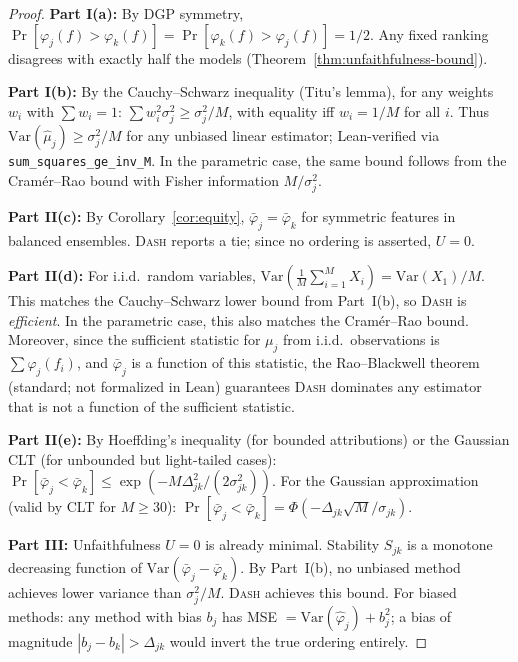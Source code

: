 \documentclass{article}
\newcommand{\Var}{\mathrm{Var}}
\newcommand{\DASH}{\textsc{Dash}}
\begin{document}
\begin{proof}
\textbf{Part I(a):} By DGP symmetry, $\Pr[\varphi_j(f) > \varphi_k(f)] = \Pr[\varphi_k(f) > \varphi_j(f)] = 1/2$. Any fixed ranking disagrees with exactly half the models (Theorem~\ref{thm:unfaithfulness-bound}).\label{thm:no-method-beats-half}

\textbf{Part I(b):} By the Cauchy--Schwarz inequality (Titu's lemma), for any weights $w_i$ with $\sum w_i = 1$: $\sum w_i^2 \sigma_j^2 \geq \sigma_j^2/M$, with equality iff $w_i = 1/M$ for all $i$. Thus $\Var(\hat\mu_j) \geq \sigma_j^2/M$ for any unbiased linear estimator; Lean-verified via \texttt{sum\_squares\_ge\_inv\_M}. In the parametric case, the same bound follows from the Cram\'er--Rao bound with Fisher information $M/\sigma_j^2$.

\textbf{Part II(c):} By Corollary~\ref{cor:equity}, $\bar\varphi_j = \bar\varphi_k$ for symmetric features in balanced ensembles. \DASH{} reports a tie; since no ordering is asserted, $U = 0$.

\textbf{Part II(d):} For i.i.d.\ random variables, $\Var(\frac{1}{M}\sum_{i=1}^M X_i) = \Var(X_1)/M$. This matches the Cauchy--Schwarz lower bound from Part~I(b), so \DASH{} is \emph{efficient}. In the parametric case, this also matches the Cram\'er--Rao bound. Moreover, since the sufficient statistic for $\mu_j$ from i.i.d.\ observations is $\sum \varphi_j(f_i)$, and $\bar\varphi_j$ is a function of this statistic, the Rao--Blackwell theorem (standard; not formalized in Lean) guarantees \DASH{} dominates any estimator that is not a function of the sufficient statistic.

\textbf{Part II(e):} By Hoeffding's inequality (for bounded attributions) or the Gaussian CLT (for unbounded but light-tailed cases): $\Pr[\bar\varphi_j < \bar\varphi_k] \leq \exp(-M\Delta_{jk}^2/(2\sigma_{jk}^2))$. For the Gaussian approximation (valid by CLT for $M \geq 30$): $\Pr[\bar\varphi_j < \bar\varphi_k] = \Phi(-\Delta_{jk}\sqrt{M}/\sigma_{jk})$.

\textbf{Part III:} Unfaithfulness $U = 0$ is already minimal. Stability $S_{jk}$ is a monotone decreasing function of $\Var(\bar\varphi_j - \bar\varphi_k)$. By Part~I(b), no unbiased method achieves lower variance than $\sigma_j^2/M$. \DASH{} achieves this bound. For biased methods: any method with bias $b_j$ has MSE $= \Var(\hat\varphi_j) + b_j^2$; a bias of magnitude $|b_j - b_k| > \Delta_{jk}$ would invert the true ordering entirely.
\end{proof}
\end{document}
